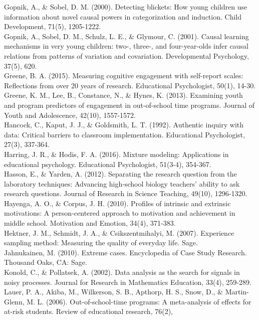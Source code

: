 \documentclass[]{msu-thesis}
\theoremstyle{definition}
\theoremstyle{definition}
\theoremstyle{definition}
\theoremstyle{remark}
\begin{document}
Gopnik, A., \& Sobel, D. M. (2000). Detecting blickets: How young
children use information about novel causal powers in categorization and
induction. Child Development, 71(5), 1205-1222.\\
Gopnik, A., Sobel, D. M., Schulz, L. E., \& Glymour, C. (2001). Causal
learning mechanisms in very young children: two-, three-, and
four-year-olds infer causal relations from patterns of variation and
covariation. Developmental Psychology, 37(5), 620.\\
Greene, B. A. (2015). Measuring cognitive engagement with self-report
scales: Reflections from over 20 years of research. Educational
Psychologist, 50(1), 14-30.\\
Greene, K. M., Lee, B., Constance, N., \& Hynes, K. (2013). Examining
youth and program predictors of engagement in out-of-school time
programs. Journal of Youth and Adolescence, 42(10), 1557-1572.\\
Hancock, C., Kaput, J. J., \& Goldsmith, L. T. (1992). Authentic inquiry
with data: Critical barriers to classroom implementation. Educational
Psychologist, 27(3), 337-364.\\
Harring, J. R., \& Hodis, F. A. (2016). Mixture modeling: Applications
in educational psychology. Educational Psychologist, 51(3-4), 354-367.\\
Hasson, E., \& Yarden, A. (2012). Separating the research question from
the laboratory techniques: Advancing high‐school biology teachers'
ability to ask research questions. Journal of Research in Science
Teaching, 49(10), 1296-1320.\\
Hayenga, A. O., \& Corpus, J. H. (2010). Profiles of intrinsic and
extrinsic motivations: A person-centered approach to motivation and
achievement in middle school. Motivation and Emotion, 34(4), 371-383.\\
Hektner, J. M., Schmidt, J. A., \& Csikszentmihalyi, M. (2007).
Experience sampling method: Measuring the quality of everyday life.
Sage.\\
Jahnukainen, M. (2010). Extreme cases. Encyclopedia of Case Study
Research. Thousand Oaks, CA: Sage.\\
Konold, C., \& Pollatsek, A. (2002). Data analysis as the search for
signals in noisy processes. Journal for Research in Mathematics
Education, 33(4), 259-289.\\
Lauer, P. A., Akiba, M., Wilkerson, S. B., Apthorp, H. S., Snow, D., \&
Martin-Glenn, M. L. (2006). Out-of-school-time programs: A meta-analysis
of effects for at-risk students. Review of educational research, 76(2),
\end{document}
